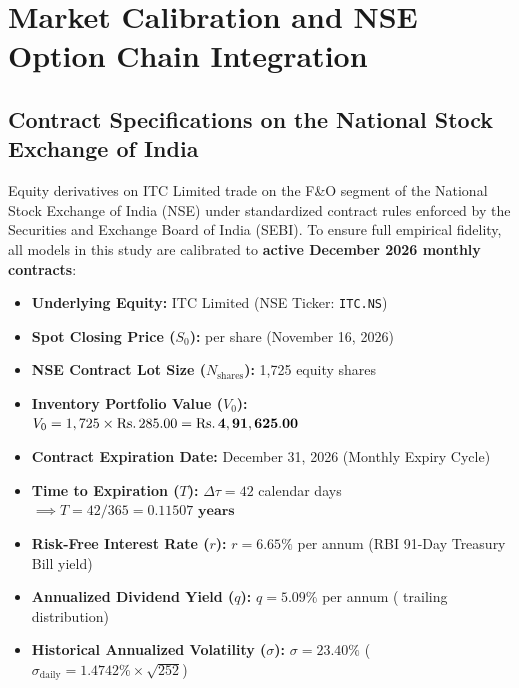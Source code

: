 
\section{Market Calibration and NSE Option Chain Integration}
\label{sec:market_calibration}

\subsection{Contract Specifications on the National Stock Exchange of India}

Equity derivatives on ITC Limited trade on the F\&O segment of the National Stock Exchange of India (NSE) under standardized contract rules enforced by the Securities and Exchange Board of India (SEBI). To ensure full empirical fidelity, all models in this study are calibrated to \textbf{active December 2026 monthly contracts}:

\begin{formulabox}
\begin{itemize}[leftmargin=1.2em, itemsep=0.5pt, parsep=0pt]
    \item \textbf{Underlying Equity:} ITC Limited (NSE Ticker: \texttt{ITC.NS})
    \item \textbf{Spot Closing Price ($S_0$):}  per share (November 16, 2026)
    \item \textbf{NSE Contract Lot Size ($N_{\text{shares}}$):} 1,725 equity shares
    \item \textbf{Inventory Portfolio Value ($V_0$):} $V_0 = 1,725 \times \text{\text{Rs.}\,}285.00 = \mathbf{\text{\text{Rs.}\,}4,91,625.00}$
    \item \textbf{Contract Expiration Date:} December 31, 2026 (Monthly Expiry Cycle)
    \item \textbf{Time to Expiration ($T$):} $\Delta \tau = 42$ calendar days $\implies T = 42 / 365 = \mathbf{0.11507 \text{ years}}$
    \item \textbf{Risk-Free Interest Rate ($r$):} $r = 6.65\%$ per annum (RBI 91-Day Treasury Bill yield)
    \item \textbf{Annualized Dividend Yield ($q$):} $q = 5.09\%$ per annum ( trailing distribution)
    \item \textbf{Historical Annualized Volatility ($\sigma$):} $\sigma = 23.40\%$ ($\sigma_{\text{daily}} = 1.4742\% \times \sqrt{252}$)
\end{itemize}
\end{formulabox}

